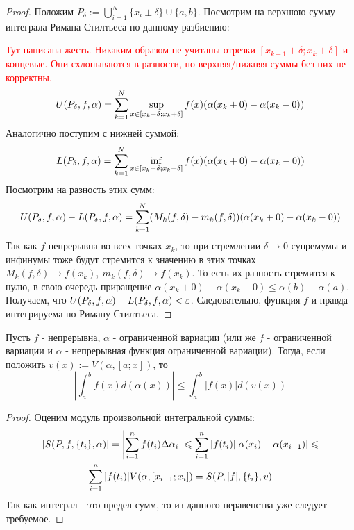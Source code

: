 \begin{proof}
	Положим $P_\delta := \bigcup\limits_{i = 1}^N \{x_i \pm \delta\} \cup \{a, b\}$. Посмотрим на верхнюю сумму интеграла Римана-Стилтьеса по данному разбиению:
	
	\textcolor{red}{Тут написана жесть. Никаким образом не учитаны отрезки $[x_{k - 1} + \delta; x_k + \delta]$ и концевые. Они схлопываются в разности, но верхняя/нижняя суммы без них не корректны.}
	\[
		U(P_\delta, f, \alpha) = \sum\limits_{k = 1}^N \sup\limits_{x \in [x_k - \delta; x_k + \delta]} f(x) (\alpha(x_k + 0) - \alpha(x_k - 0))
	\]
	Аналогично поступим с нижней суммой:
	\[
		L(P_\delta, f, \alpha) = \sum\limits_{k = 1}^N \inf\limits_{x \in [x_k - \delta; x_k + \delta]} f(x) (\alpha(x_k + 0) - \alpha(x_k - 0))
	\]
	Посмотрим на разность этих сумм:
	\[
		U(P_\delta, f, \alpha) - L(P_\delta, f, \alpha) = \sum\limits_{k = 1}^N (M_k(f, \delta) - m_k(f, \delta)) (\alpha(x_k + 0) - \alpha(x_k - 0))
	\]
	Так как $f$ непрерывна во всех точках $x_k$, то при стремлении $\delta \to 0$ супремумы и инфинумы тоже будут стремится к значению в этих точках $M_k(f, \delta) \to f(x_k),\ m_k(f, \delta) \to f(x_k)$. То есть их разность стремится к нулю, в свою очередь приращение $\alpha(x_k + 0) - \alpha(x_k - 0) \leq \alpha(b) - \alpha(a)$.
	Получаем, что $U(P_\delta, f, \alpha) - L(P_\delta, f, \alpha) < \varepsilon$. Следовательно, функция $f$ и правда интегрируема по Риману-Стилтьеса.
\end{proof}

\begin{theorem}
	Пусть $f$ - непрерывна, $\alpha$ - ограниченной вариации (или же $f$ - ограниченной вариации и $\alpha$ - непрерывная функция ограниченной вариации). Тогда, если положить $v(x) := V(\alpha, [a; x])$, то
	\[
		\left|\int_a^b f(x) d(\alpha(x))\right| \le \int_a^b |f(x)| d(v(x))
	\]
\end{theorem}

\begin{proof}
	Оценим модуль произвольной интегральной суммы:
	\begin{multline*}
		|S(P, f, \{t_i\}, \alpha)| = \left|\sum\limits_{i = 1}^n f(t_i) \Delta \alpha_i\right| \leqslant \sum\limits_{i = 1}^n |f(t_i)| |\alpha(x_i) - \alpha(x_{i - 1})| \leqslant
		\\
		\sum\limits_{i = 1}^n |f(t_i)| V(\alpha, [x_{i - 1}; x_i]) = S(P, |f|, \{t_i\}, v)
	\end{multline*}
	Так как интеграл - это предел сумм, то из данного неравенства уже следует требуемое.
\end{proof}


